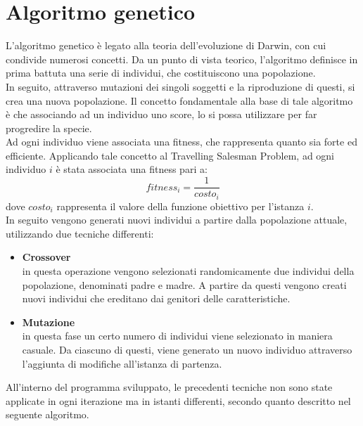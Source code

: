 \section{Algoritmo genetico}
L'algoritmo genetico è legato alla teoria dell'evoluzione di Darwin, con cui condivide numerosi concetti. Da un punto di vista teorico, l'algoritmo definisce in prima battuta una serie di individui, che costituiscono una popolazione.\\
In seguito, attraverso mutazioni dei singoli soggetti e la riproduzione di questi, si crea una nuova popolazione. Il concetto fondamentale alla base di tale algoritmo è che associando ad un individuo uno score, lo si possa utilizzare per far progredire la specie.\\
Ad ogni individuo viene associata una fitness, che rappresenta quanto sia forte ed efficiente. Applicando tale concetto al Travelling Salesman Problem, ad ogni individuo $i$ è stata associata una fitness pari a:
$$fitness_i=\frac{1}{costo_i}$$
dove $costo_i$ rappresenta il valore della funzione obiettivo per l'istanza $i$.\\
In seguito vengono generati nuovi individui a partire dalla popolazione attuale, utilizzando due tecniche differenti:
\begin{itemize}
\item{\textbf{Crossover}\\
in questa operazione vengono selezionati randomicamente due individui della popolazione, denominati padre e madre. A partire da questi vengono creati nuovi individui che ereditano dai genitori delle caratteristiche.}
\item{\textbf{Mutazione}\\
in questa fase un certo numero di individui viene selezionato in maniera casuale. Da ciascuno di questi, viene generato un nuovo individuo attraverso l'aggiunta di modifiche all'istanza di partenza.}
\end{itemize}
All'interno del programma sviluppato, le precedenti tecniche non sono state applicate in ogni iterazione ma in istanti differenti, secondo quanto descritto nel seguente algoritmo.


